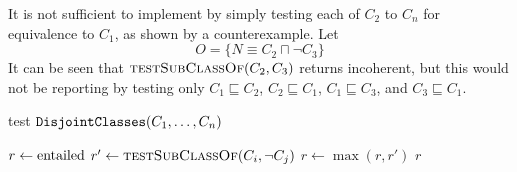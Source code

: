 \documentclass[paper.tex]{subfiles}
\begin{document}
It is not sufficient to implement  by simply testing each of $C_2$ to $C_n$ for equivalence to $C_1$, as shown by a counterexample.  Let
\[ O = \{ N \equiv C_2 \sqcap \neg C_3 \} \]
It can be seen that $\Call{testSubClassOf}{C_2, C_3}$ returns incoherent, but this would not be reporting by testing only $C_1 \sqsubseteq C_2$, $C_2 \sqsubseteq C_1$, $C_1 \sqsubseteq C_3$, and $C_3 \sqsubseteq C_1$.

\medskip

\begin{algorithm}[H]
  \caption{test $\mathtt{DisjointClasses}(C_1, \ldots, C_n)$}
  \begin{algorithmic}[1]
    \raggedright
      \State $r \gets \mathrm{entailed}$
          \State $r' \gets \Call{testSubClassOf}{C_i, \neg C_j}$
          \label{alg:testDisjointClasses:inner}
          \State $r \gets \max(r, r')$
        \EndFor
      \EndFor
      \State \Return $r$
    \EndFunction
  \end{algorithmic}
\end{algorithm}
\end{document}
